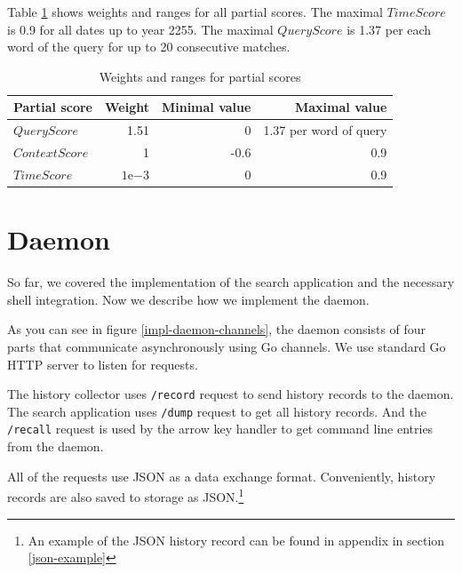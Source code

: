 Table \ref{tab:score-weights-ranges} shows weights and ranges for all partial scores. The maximal \(TimeScore\) is 0.9 for all dates up to year 2255. The maximal \(QueryScore\) is 1.37 per each word of the query for up to 20 consecutive matches. 


\begin{table}[h!]
\centering
\begin{tabular}{lrrr}
\hline \hline
Partial score & Weight & Minimal value & Maximal value \\
\hline
$QueryScore$ & 1.51 & 0 & 1.37 per word of query  \\ 
$ContextScore$ & 1 & -0.6 & 0.9 \\ 
$TimeScore$ & $1\mathrm{e}{-3}$ & 0 & 0.9 \\
\hline \hline
\end{tabular}
\caption{Weights and ranges for partial scores}
\label{tab:score-weights-ranges}
\end{table}

\newpage
\section{Daemon}

So far, we covered the implementation of the search application and the necessary shell integration. Now we describe how we implement the daemon.


As you can see in figure \ref{impl-daemon-channels}, the daemon consists of four parts that communicate asynchronously using Go channels\cite{lib-go-channels}. We use standard Go HTTP server\cite{lib-go-http} to listen for requests. 

The history collector uses \verb|/record| request to send history records to the daemon. The search application uses \verb|/dump| request to get all history records. And the \verb|/recall| request is used by the arrow key handler to get command line entries from the daemon. 

All of the requests use JSON as a data exchange format. Conveniently, history records are also saved to storage as JSON.\footnote{An example of the JSON history record can be found in appendix in section \ref{json-example}} 


